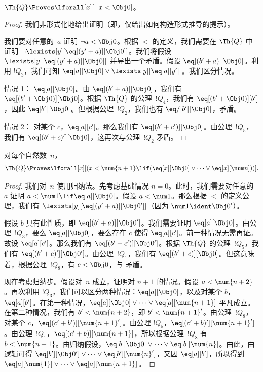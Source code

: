 \documentclass[../../../include/open-logic-section]{subfiles}
\begin{document}
\begin{lem}
$\Th{Q} \Proves \lforall[x][\lnot x < \Obj 0]$。
\end{lem}

\begin{proof}
我们非形式化地给出证明（即，仅给出如何构造形式推导的提示）。

我们要对任意的~$a$ 证明 $\lnot a < \Obj 0$。根据 $<$ 的定义，我们需要在 $\Th{Q}$ 中证明 $\lnot
\lexists[y][\eq[(y'+a)][\Obj 0]]$。我们将假设 $\lexists[y][\eq[(y'+a)][\Obj 0]]$ 并导出一个矛盾。假设 $\eq[(b'+a)][\Obj 0]$。利用 $!Q_3$，我们可知 $\eq[a][\Obj 0] \lor \lexists[y][\eq[a][y']]$。我们区分情况。

情况 1： $\eq[a][\Obj 0]$。由 $\eq[(b'+a)][\Obj 0]$，我们有 $\eq[(b' + \Obj 0)][\Obj 0]$。根据 $\Th{Q}$ 的公理~$!Q_4$，我们有 $\eq[(b' + \Obj 0)][b']$，因此 $\eq[b'][\Obj 0]$。但根据公理~$!Q_2$，我们也有 $\eq/[b'][\Obj 0]$，矛盾。

情况 2： 对某个 $c$，$\eq[a][c']$。那么我们有 $\eq[(b' +
c')][\Obj 0]$。由公理~$!Q_5$，我们有 $\eq[(b' + c)'][\Obj 0]$，这再次与公理~$!Q_2$ 矛盾。
\end{proof}

\begin{lem}
对每个自然数~$n$，
  \[
  \Th{Q} \Proves
  \lforall[x][(x < \num {n+1} \lif (\eq[x][\Obj 0] \lor \dots \lor
    \eq[x][\num n]))].
  \]
\end{lem}

\begin{proof}
我们对~$n$ 使用归纳法。先考虑基础情况 $n = 0$。此时，我们需要对任意的~$a$ 证明 $a < \num 1 \lif \eq[a][\Obj 0]$。假设 $a < \num 1$。那么根据 $<$ 的定义公理，我们有 $\lexists[y][\eq[(y'+a)][\Obj 0']]$（因为 $\num 1 \ident \Obj 0'$）。

假设 $b$ 具有此性质，即 $\eq[(b'+a)][\Obj 0']$。我们需要证明 $\eq[a][\Obj 0]$。由公理~$!Q_3$，要么 $\eq[a][\Obj 0]$，要么存在 $c$ 使得 $\eq[a][c']$。前一种情况无需再证。故设 $\eq[a][c']$。那么我们有 $\eq[(b' + c')][\Obj 0']$。根据 $\Th{Q}$ 的公理~$!Q_5$，我们有 $\eq[(b'+c)'][\Obj 0']$。由公理~$!Q_1$，我们有 $\eq[(b' + c)][\Obj
0]$。但这意味着，根据公理~$!Q_8$，有 $c < \Obj 0$，与  矛盾。

现在考虑归纳步。假设对~$n$ 成立，证明对 $n+1$ 的情况。假设 $a < \num {n+2}$。再次利用 $!Q_3$，我们可以区分两种情况：$\eq[a][\Obj 0]$，以及对某个 $b$，$\eq[a][b']$。在第一种情况，$\eq[a][\Obj 0] \lor \dots \lor
\eq[a][\num{n+1}]$ 平凡成立。在第二种情况，我们有 $b' < \num {n+2}$，即 $b' < \num{n+1}'$。由公理~$!Q_8$，对某个 $c$，$\eq[(c'+b')][\num{n+1}']$。由公理 $!Q_5$，$\eq[(c'+b)'][\num{n+1}']$。由公理~$!Q_1$，$\eq[(c'+b)][\num{n+1}]$，所以根据公理~$!Q_8$ 有 $b < \num{n+1}$。由归纳假设，$\eq[b][\Obj 0] \lor \dots \lor \eq[b][\num{n}]$。由此，由逻辑可得 $\eq[b'][\Obj 0'] \lor \dots \lor \eq[b'][\num{n}']$，又因 $\eq[a][b']$，所以得到 $\eq[a][\num{1}] \lor \dots \lor \eq[a][\num{n+1}]$。
\end{proof}
\end{document}
